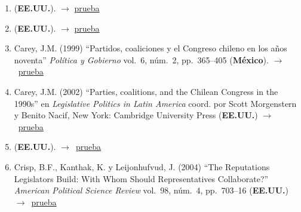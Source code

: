 \documentclass[12 pt, letter]{article}
\newenvironment{CitasMiTrabajo}{
    \begin{footnotesize}
    \begin{enumerate}[label={\footnotesize\emph{cita~\arabic*}},ref=\arabic*] %
        \setlength{\itemsep}{.1\itemsep}
        \setlength{\parskip}{.1\parskip}
    }{\end{enumerate}\end{footnotesize}}
\begin{document}
\begin{CitasMiTrabajo}
        \item {} (\textbf{EE.UU.}). $\rightarrow$ \href{http://gvptsites.umd.edu/calvo/Calvo%20-%20Murillo-%20When_Parties_Meet_Voters_final%20revision_CPS.pdf}{prueba}
        
        \item {} (\textbf{EE.UU.}). $\rightarrow$ \href{https://s3.amazonaws.com/academia.edu.documents/42680581/Why_Coalitions_Party_System_Fragmentatio20160214-23047-vrdefh.pdf?response-content-disposition=inline%3B%20filename%3DWhy_coalitions_Party_system_fragmentatio.pdf&X-Amz-Algorithm=AWS4-HMAC-SHA256&X-Amz-Credential=AKIAIWOWYYGZ2Y53UL3A%2F20191118%2Fus-east-1%2Fs3%2Faws4_request&X-Amz-Date=20191118T185633Z&X-Amz-Expires=3600&X-Amz-SignedHeaders=host&X-Amz-Signature=7f0ebe756074d6eca6743a304b445f61dfe8832a2a27056b3fcacee053aa73cb}{prueba}
        
        \item Carey, J.M. (1999)
        ``Partidos, coaliciones y el Congreso chileno en los a\~nos noventa''
        \emph{Pol\'itica y Gobierno}
        vol.\ 6, n\'um.\ 2, pp.\ 365--405   (\textbf{M\'exico}). $\rightarrow$~\href{https://github.com/emagar/cv/blob/master/citasMiTrab/mrs/careyPartCongChile1999pyg.excerpt.pdf}{prueba}

        \item Carey, J.M. (2002)
        ``Parties, coalitions, and the Chilean Congress in the 1990s''
        en \emph{Legislative Politics in Latin America}
        coord. por Scott Morgenstern y Benito Nacif, New York: Cambridge
        University Press (\textbf{EE.UU.}) $\rightarrow$~\href{https://github.com/emagar/cv/blob/master/citasMiTrab/mrs/careyInMorgNacif.pdf}{prueba}

        \item {} (\textbf{EE.UU.}). $\rightarrow$~\href{https://www.cambridge.org/core/journals/american-political-science-review/article/positioning-under-alternative-electoral-systems-evidence-from-japanese-candidate-election-manifestos/D0D7EE4EEDBDEED88F6550AEA2841870}{prueba}
        
        \item Crisp, B.F., Kanthak, K. y Leijonhufvud, J. (2004)
        ``The Reputations Legislators Build: With Whom Should Representatives Collaborate?''
        \emph{American Political Science Review} vol.\ 98, n\'um.\ 4, pp.\ 703--16  (\textbf{EE.UU.}) $\rightarrow$~\href{https://github.com/emagar/cv/blob/master/citasMiTrab/mrs/crispEtAl.pdf}{prueba}


\end{CitasMiTrabajo}
\end{document}
